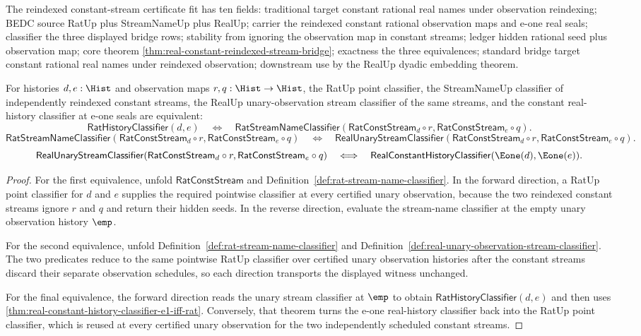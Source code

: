 The reindexed constant-stream certificate fit has ten fields: traditional target
constant rational real names under observation reindexing; BEDC source RatUp
plus StreamNameUp plus RealUp; carrier the reindexed constant rational
observation maps and e-one real seals; classifier the three displayed bridge
rows; stability from ignoring the observation map in constant streams; ledger
hidden rational seed plus observation map; core theorem
\autoref{thm:real-constant-reindexed-stream-bridge}; exactness the three
equivalences; standard bridge target constant rational real names under
reindexed observation; downstream use by the RealUp dyadic embedding theorem.

\begin{theorem}
\label{thm:real-constant-independent-reindexed-stream-bridge}
For histories $d,e:\Hist$ and observation maps $r,q:\Hist\to\Hist$, the RatUp
point classifier, the StreamNameUp classifier of independently reindexed
constant streams, the RealUp unary-observation stream classifier of the same
streams, and the constant real-history classifier at e-one seals are equivalent:
$$
\mathsf{RatHistoryClassifier}(d,e)
\quad\Longleftrightarrow\quad
\mathsf{RatStreamNameClassifier}(\mathsf{RatConstStream}_d\circ r,
\mathsf{RatConstStream}_e\circ q).
$$
$$
\mathsf{RatStreamNameClassifier}(\mathsf{RatConstStream}_d\circ r,
\mathsf{RatConstStream}_e\circ q)
\quad\Longleftrightarrow\quad
\mathsf{RealUnaryStreamClassifier}(\mathsf{RatConstStream}_d\circ r,
\mathsf{RatConstStream}_e\circ q).
$$
$$
\mathsf{RealUnaryStreamClassifier}(\mathsf{RatConstStream}_d\circ r,
\mathsf{RatConstStream}_e\circ q)
\quad\Longleftrightarrow\quad
\mathsf{RealConstantHistoryClassifier}(\Eone(d),\Eone(e)).
$$
\end{theorem}
\begin{proof}
For the first equivalence, unfold $\mathsf{RatConstStream}$ and
Definition~\ref{def:rat-stream-name-classifier}. In the forward direction, a
RatUp point classifier for $d$ and $e$ supplies the required pointwise
classifier at every certified unary observation, because the two reindexed
constant streams ignore $r$ and $q$ and return their hidden seeds. In the
reverse direction, evaluate the stream-name classifier at the empty unary
observation history $\emp$.

For the second equivalence, unfold
Definition~\ref{def:rat-stream-name-classifier} and
Definition~\ref{def:real-unary-observation-stream-classifier}. The two
predicates reduce to the same pointwise RatUp classifier over certified unary
observation histories after the constant streams discard their separate
observation schedules, so each direction transports the displayed witness
unchanged.

For the final equivalence, the forward direction reads the unary stream
classifier at $\emp$ to obtain $\mathsf{RatHistoryClassifier}(d,e)$ and then
uses \autoref{thm:real-constant-history-classifier-e1-iff-rat}. Conversely, that
theorem turns the e-one real-history classifier back into the RatUp point
classifier, which is reused at every certified unary observation for the two
independently scheduled constant streams.
\end{proof}
